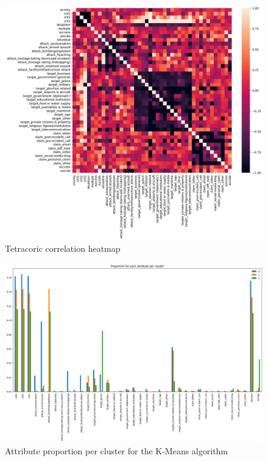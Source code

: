 \documentclass{article}
\begin{document}
\begin{figure}
    \centering
    \includegraphics[width=1\linewidth]{img//Variable correlation/correlation_heatmap_2.png}
    \caption{Tetracoric correlation heatmap}
    \label{fig:tetracoric_heatmap}
\end{figure}

\begin{figure}
    \centering
    \includegraphics[width=0.90\linewidth]{img//Clustering/kmeans cluster propotions.png}
    \caption{Attribute proportion per cluster for the K-Means algorithm}
    \label{fig:kmeans-attributes}
\end{figure}
\end{document}
